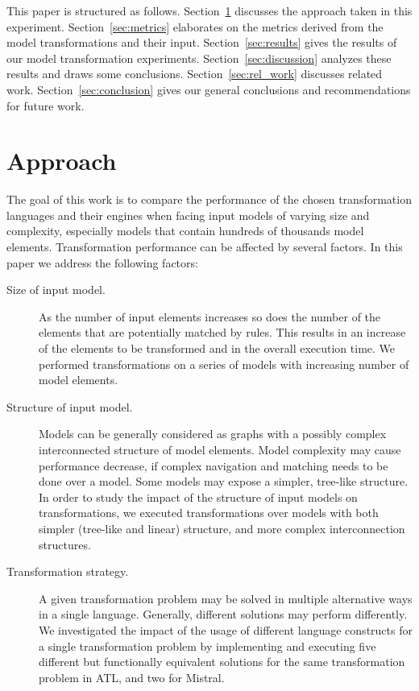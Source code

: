 \documentclass[12pt]{elsarticle}
\begin{document}
This paper is structured as follows. Section~\ref{sec:approach} discusses the
approach taken in this experiment. Section~\ref{sec:metrics} elaborates on
the metrics derived from the model transformations and their input.
Section~\ref{sec:results} gives the results of our model transformation
experiments. Section~\ref{sec:discussion} analyzes these results and draws some conclusions.
Section~\ref{sec:rel_work} discusses related work. Section~\ref{sec:conclusion}
gives our general conclusions and recommendations for future work.

\section{Approach}\label{sec:approach}

The goal of this work is to compare the performance of the chosen transformation
languages and their engines when facing input models of varying size and complexity,
especially models that contain hundreds of thousands model elements.
Transformation performance can be affected by several factors. In this paper we
address the following factors:

\begin{description}
\item[Size of input model.] As the number of input elements increases so does
the number of the elements that are potentially matched by rules. This results
in an increase of the elements to be transformed and in the overall execution
time. We performed transformations on a series of models with increasing number
of model elements.
\item[Structure of input model.] Models can be generally considered as graphs with a possibly
complex interconnected structure of model elements. Model complexity may cause
performance decrease, if complex navigation and matching needs to be done over a model. Some models may expose a simpler, tree-like structure. In order to study the impact of the structure of input models on transformations, we
executed transformations over models with both simpler (tree-like and linear) structure, and
more complex interconnection structures.
\item [Transformation strategy.] A given transformation problem may be solved
in multiple alternative ways in a single language. Generally, different solutions may
perform differently. We investigated the impact of the usage of different language
constructs for a single transformation problem by implementing and executing
five different but functionally equivalent solutions for the same
transformation problem in ATL, and two for Mistral.
\end{description}
\end{document}
